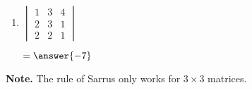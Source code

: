\documentclass{ximera}
\begin{document}
\begin{exercise}
\begin{enumerate}
  \item
    $\begin{vmatrix}
      1 & 3 & 4 \\
      2 & 3 & 1 \\
      2 & 2 & 1
    \end{vmatrix}$ \begin{prompt} $= \answer{-7}$ \end{prompt}
  \pdfOnly{\end{multicols}}
  \end{enumerate}
  \textbf{Note.} The rule of Sarrus only works for $3 \times 3$ matrices.

\end{exercise}
\end{document}

